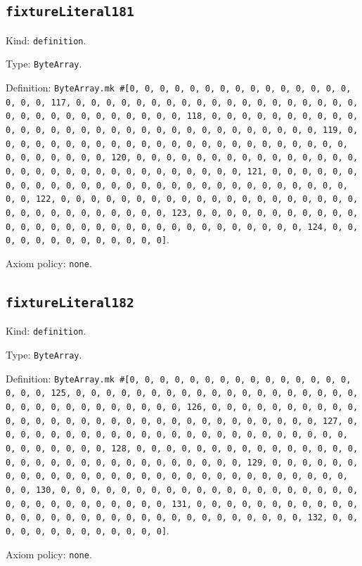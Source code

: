 \documentclass[11pt]{article}
\begin{document}
\subsection*{\texttt{fixtureLiteral181}}
\noindent Kind: \texttt{definition}.\par
\noindent Type: \texttt{ByteArray}.\par
\noindent Definition: \texttt{ByteArray.mk \#[0, 0, 0, 0, 0, 0, 0, 0, 0, 0, 0, 0, 0, 0, 0, 0, 0, 0, 117, 0, 0, 0, 0, 0, 0, 0, 0, 0, 0, 0, 0, 0, 0, 0, 0, 0, 0, 0, 0, 0, 0, 0, 0, 0, 0, 0, 0, 0, 0, 0, 118, 0, 0, 0, 0, 0, 0, 0, 0, 0, 0, 0, 0, 0, 0, 0, 0, 0, 0, 0, 0, 0, 0, 0, 0, 0, 0, 0, 0, 0, 0, 0, 119, 0, 0, 0, 0, 0, 0, 0, 0, 0, 0, 0, 0, 0, 0, 0, 0, 0, 0, 0, 0, 0, 0, 0, 0, 0, 0, 0, 0, 0, 0, 0, 120, 0, 0, 0, 0, 0, 0, 0, 0, 0, 0, 0, 0, 0, 0, 0, 0, 0, 0, 0, 0, 0, 0, 0, 0, 0, 0, 0, 0, 0, 0, 0, 121, 0, 0, 0, 0, 0, 0, 0, 0, 0, 0, 0, 0, 0, 0, 0, 0, 0, 0, 0, 0, 0, 0, 0, 0, 0, 0, 0, 0, 0, 0, 0, 122, 0, 0, 0, 0, 0, 0, 0, 0, 0, 0, 0, 0, 0, 0, 0, 0, 0, 0, 0, 0, 0, 0, 0, 0, 0, 0, 0, 0, 0, 0, 0, 123, 0, 0, 0, 0, 0, 0, 0, 0, 0, 0, 0, 0, 0, 0, 0, 0, 0, 0, 0, 0, 0, 0, 0, 0, 0, 0, 0, 0, 0, 0, 0, 124, 0, 0, 0, 0, 0, 0, 0, 0, 0, 0, 0, 0, 0]}.\par
\noindent Axiom policy: \texttt{none}.\par
\subsection*{\texttt{fixtureLiteral182}}
\noindent Kind: \texttt{definition}.\par
\noindent Type: \texttt{ByteArray}.\par
\noindent Definition: \texttt{ByteArray.mk \#[0, 0, 0, 0, 0, 0, 0, 0, 0, 0, 0, 0, 0, 0, 0, 0, 0, 0, 125, 0, 0, 0, 0, 0, 0, 0, 0, 0, 0, 0, 0, 0, 0, 0, 0, 0, 0, 0, 0, 0, 0, 0, 0, 0, 0, 0, 0, 0, 0, 0, 126, 0, 0, 0, 0, 0, 0, 0, 0, 0, 0, 0, 0, 0, 0, 0, 0, 0, 0, 0, 0, 0, 0, 0, 0, 0, 0, 0, 0, 0, 0, 0, 127, 0, 0, 0, 0, 0, 0, 0, 0, 0, 0, 0, 0, 0, 0, 0, 0, 0, 0, 0, 0, 0, 0, 0, 0, 0, 0, 0, 0, 0, 0, 0, 128, 0, 0, 0, 0, 0, 0, 0, 0, 0, 0, 0, 0, 0, 0, 0, 0, 0, 0, 0, 0, 0, 0, 0, 0, 0, 0, 0, 0, 0, 0, 0, 129, 0, 0, 0, 0, 0, 0, 0, 0, 0, 0, 0, 0, 0, 0, 0, 0, 0, 0, 0, 0, 0, 0, 0, 0, 0, 0, 0, 0, 0, 0, 0, 130, 0, 0, 0, 0, 0, 0, 0, 0, 0, 0, 0, 0, 0, 0, 0, 0, 0, 0, 0, 0, 0, 0, 0, 0, 0, 0, 0, 0, 0, 0, 0, 131, 0, 0, 0, 0, 0, 0, 0, 0, 0, 0, 0, 0, 0, 0, 0, 0, 0, 0, 0, 0, 0, 0, 0, 0, 0, 0, 0, 0, 0, 0, 0, 132, 0, 0, 0, 0, 0, 0, 0, 0, 0, 0, 0, 0, 0]}.\par
\noindent Axiom policy: \texttt{none}.\par
\end{document}
